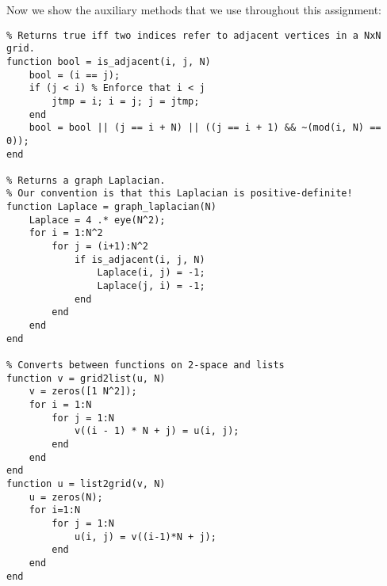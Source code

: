 \documentclass[10pt]{article}
\theoremstyle{definition}
\begin{document}
Now we show the auxiliary methods that we use throughout this assignment:

\begin{verbatim}
% Returns true iff two indices refer to adjacent vertices in a NxN grid.
function bool = is_adjacent(i, j, N)
    bool = (i == j);
    if (j < i) % Enforce that i < j
        jtmp = i; i = j; j = jtmp;
    end
    bool = bool || (j == i + N) || ((j == i + 1) && ~(mod(i, N) == 0));
end

% Returns a graph Laplacian.
% Our convention is that this Laplacian is positive-definite!
function Laplace = graph_laplacian(N)
    Laplace = 4 .* eye(N^2);
    for i = 1:N^2
        for j = (i+1):N^2
            if is_adjacent(i, j, N)
                Laplace(i, j) = -1;
                Laplace(j, i) = -1;
            end
        end
    end
end

% Converts between functions on 2-space and lists
function v = grid2list(u, N)
    v = zeros([1 N^2]);
    for i = 1:N
        for j = 1:N
            v((i - 1) * N + j) = u(i, j);
        end
    end
end
function u = list2grid(v, N)
    u = zeros(N);
    for i=1:N
        for j = 1:N
            u(i, j) = v((i-1)*N + j);
        end
    end
end
\end{verbatim}
\end{document}
